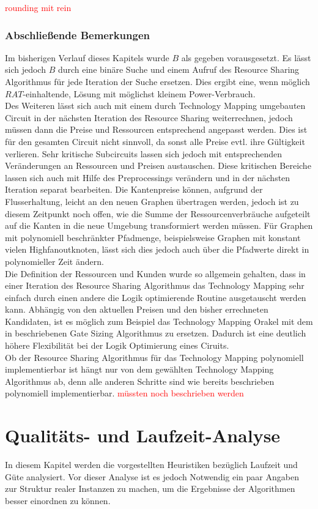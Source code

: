 \documentclass[11pt, a4paper, german]{article}
\newcommand{\TM}{Technology  Mapping }
\begin{document}
\textcolor{red}{rounding mit rein}

\subsubsection{Abschließende Bemerkungen}
Im bisherigen Verlauf dieses Kapitels wurde $B$ als gegeben vorausgesetzt. Es lässt sich jedoch $B$ durch eine binäre Suche und einem Aufruf des Resource Sharing Algorithmus für jede Iteration der Suche ersetzen. Dies ergibt eine, wenn möglich $RAT$-einhaltende, Lösung mit möglichst kleinem Power-Verbrauch. \\
Des Weiteren lässt sich auch mit einem durch \TM umgebauten Circuit in der nächsten Iteration des Resource Sharing weiterrechnen, jedoch müssen dann die Preise und Ressourcen entsprechend angepasst werden. Dies ist für den gesamten Circuit nicht sinnvoll, da sonst alle Preise evtl. ihre Gültigkeit verlieren. Sehr kritische Subcircuits lassen sich jedoch  mit entsprechenden Veränderungen an Ressourcen und Preisen austauschen. Diese kritischen Bereiche lassen sich auch mit Hilfe des Preprocessings verändern und in der nächsten Iteration separat bearbeiten. Die Kantenpreise können, aufgrund der Flusserhaltung, leicht an den neuen Graphen übertragen werden, jedoch ist zu diesem Zeitpunkt noch offen, wie die Summe der Ressourcenverbräuche aufgeteilt auf die Kanten in die neue Umgebung transformiert werden müssen. Für Graphen mit polynomiell beschränkter Pfadmenge, beispielsweise Graphen mit konstant vielen Highfanoutknoten, lässt sich dies jedoch auch über die Pfadwerte direkt in polynomieller Zeit ändern. \\
Die Definition der Ressourcen und Kunden wurde so allgemein gehalten, dass in einer Iteration des Resource Sharing Algorithmus das \TM sehr einfach durch einen andere die Logik optimierende Routine ausgetauscht werden kann. Abhängig von den aktuellen Preisen und den bisher errechneten Kandidaten, ist es möglich zum Beispiel das \TM Orakel mit  dem  in \cite{Daboul2018} beschriebenen  Gate Sizing Algorithmus zu ersetzen.  Dadurch ist eine deutlich höhere Flexibilität bei der Logik Optimierung eines Ciruits. \\
Ob der Resource Sharing Algorithmus für das \TM polynomiell implementierbar ist hängt nur von dem gewählten \TM Algorithmus ab, denn alle anderen Schritte sind wie bereits beschrieben polynomiell implementierbar. \textcolor{red}{müssten noch beschrieben werden}

\section{Qualitäts- und Laufzeit-Analyse}
\label{sec:analyse}
In diesem Kapitel werden die vorgestellten Heuristiken bezüglich Laufzeit und Güte analysiert. Vor dieser Analyse ist es jedoch Notwendig ein paar Angaben zur Struktur realer Instanzen zu machen, um die Ergebnisse der Algorithmen besser einordnen zu können.
\end{document}
